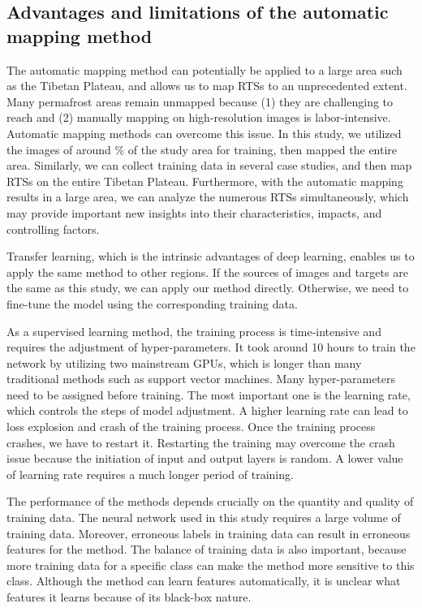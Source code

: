 \documentclass[authoryear,preprint,review,12pt]{elsarticle}
\begin{document}
\subsection{Advantages and limitations of the automatic mapping method}
\label{subsec_advantage_limitation_method}

The automatic mapping method can potentially be applied to a large area such as the Tibetan Plateau, and allows us to map RTSs to an unprecedented extent. Many permafrost areas remain unmapped because (1) they are challenging to reach and (2) manually mapping on high-resolution images is labor-intensive. Automatic mapping methods can overcome this issue. In this study, we utilized the images of around \% of the study area for training, then mapped the entire area. Similarly, we can collect training data in several case studies, and then map RTSs on the entire Tibetan Plateau. Furthermore, with the automatic mapping results in a large area, we can analyze the numerous RTSs simultaneously, which may provide important new insights into their characteristics, impacts, and controlling factors.  

Transfer learning, which is the intrinsic advantages of deep learning, enables us to apply the same method to other regions. If the sources of images and targets are the same as this study, we can apply our method directly. Otherwise, we need to fine-tune the model using the corresponding training data. 

As a supervised learning method, the training process is time-intensive and requires the adjustment of hyper-parameters. It took around 10 hours to train the network by utilizing two mainstream GPUs, which is longer than many traditional methods such as support vector machines. Many hyper-parameters need to be assigned before training. The most important one is the learning rate, which controls the steps of model adjustment. A higher learning rate can lead to loss explosion and crash of the training process. Once the training process crashes, we have to restart it. Restarting the training may overcome the crash issue because the initiation of input and output layers is random. A lower value of learning rate requires a much longer period of training. 

The performance of the methods depends crucially on the quantity and quality of training data. The neural network used in this study requires a large volume of training data. Moreover, erroneous labels in training data can result in erroneous features for the method. The balance of training data is also important, because more training data for a specific class can make the method more sensitive to this class. Although the method can learn features automatically, it is unclear what features it learns because of its black-box nature. 
\end{document}
